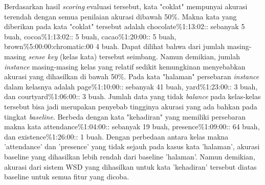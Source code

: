 Berdasarkan hasil \textit{scoring} evaluasi tersebut, kata "coklat" mempunyai akurasi terendah dengan semua penilaian akurasi dibawah 50\%. Makna kata yang diberikan pada kata "coklat" tersebut adalah chocolate\%1:13:02:: sebanyak 5 buah, cocoa\%1:13:02:: 5 buah, cacao\%1:20:00:: 5 buah, brown\%5:00:00:chromatic:00 4 buah. Dapat dilihat bahwa dari jumlah masing-masing \textit{sense key} (kelas kata) tersebut seimbang. Namun demikian, jumlah \textit{instance} masing-masing kelas yang relatif sedikit kemungkinan menyebabkan akurasi yang dihasilkan di bawah 50\%. Pada kata "halaman" persebaran \textit{instance} dalam kelasnya adalah page\%1:10:00:: sebanyak 41 buah, yard\%1:23:00:: 3 buah, dan courtyard\%1:06:00:: 3 buah. Jumlah data yang tidak \textit{balance} pada kelas-kelas tersebut bisa jadi merupakan penyebab tingginya akurasi yang ada bahkan pada tingkat \textit{baseline}. Berbeda dengan kata "kehadiran" yang memiliki persebaran makna kata attendance\%1:04:00:: sebanyak 19 buah, presence\%1:09:00:: 64 buah, dan existence\%1:26:00:: 1 buah. Dengan perbedaan antara kelas makna 'attendance' dan 'presence' yang tidak sejauh pada kasus kata 'halaman', akurasi baseline yang dihasilkan lebih rendah dari baseline 'halaman'. Namun demikian, akurasi dari sistem WSD yang dihasilkan untuk kata 'kehadiran' tersebut diatas baseline untuk semua fitur yang dicoba.